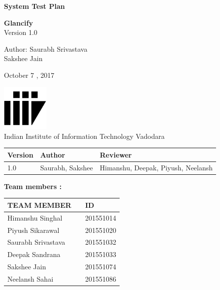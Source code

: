 \documentclass[12pt]{article}
\renewcommand{\today}{October 7 , 2017}
\begin{document}
\begin{titlepage}
		\begin{center}
			
			
			\LARGE{\textbf{System Test Plan}}
			
			\vspace{1.5cm}
			
			\textbf{Glancify}\\
			
			\small{Version 1.0}
			\vspace{3cm}
		 
            \large{Author: \hspace{0.5cm}Saurabh Srivastava \\\hspace{1cm}Sakshee Jain}	
    	
			\vspace{1.5cm}
			
			\today
			
			\vspace{4.5cm}
			\includegraphics[width=0.17\textwidth]{iiitv.png} \\
			\Large{Indian Institute of Information Technology Vadodara} \\
			
		\end{center}
	\end{titlepage}
	\newpage
	
	\begin{tabular}{ |m{4em}| m{10em}| m{10em}|}
	    \hline
	    Version & Author & Reviewer\\
	    \hline
	     1.0 &Saurabh, Sakshee& Himanshu, Deepak, Piyush, Neelansh \\
	     \hline
	\end{tabular}
	
	
	\newpage
\textbf{Team members :} \\
\begin{center}
	\begin{tabular}{ |m{10em} m{8em}m{9em}|}
		\hline
		TEAM MEMBER &   & ID        \\
		\hline
		Himanshu Singhal &   & 201551014 \\
		Piyush Sikarawal &   & 201551020 \\
		Saurabh Srivastava &   & 201551032 \\
	    Deepak Sandrana &   & 201551033 \\
		Sakshee Jain &   & 201551074 \\
		Neelansh Sahai &   & 201551086 \\ 
		\hline
	\end{tabular}
	
\end{center}
\end{document}
